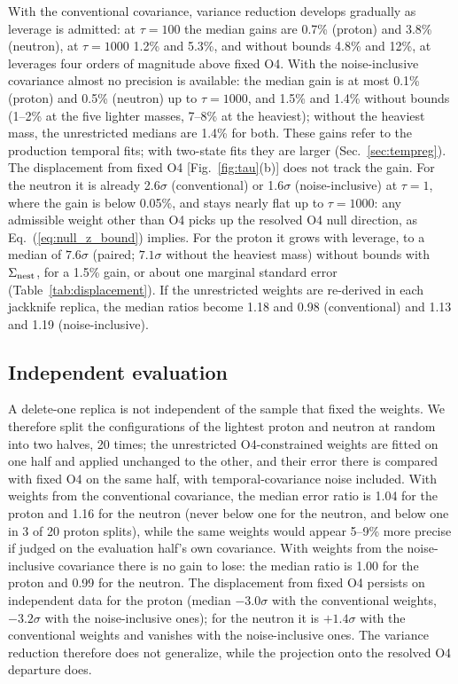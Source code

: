 \documentclass[aps,prd,reprint,twocolumn,superscriptaddress,nofootinbib,longbibliography]{revtex4-2}
\begin{document}
With the conventional covariance, variance reduction develops gradually as leverage is admitted: at $\tau=100$ the median gains are 0.7\% (proton) and 3.8\% (neutron), at $\tau=1000$ 1.2\% and 5.3\%, and without bounds 4.8\% and 12\%, at leverages four orders of magnitude above fixed O4. With the noise-inclusive covariance almost no precision is available: the median gain is at most 0.1\% (proton) and 0.5\% (neutron) up to $\tau=1000$, and 1.5\% and 1.4\% without bounds (1--2\% at the five lighter masses, 7--8\% at the heaviest); without the heaviest mass, the unrestricted medians are 1.4\% for both. These gains refer to the production temporal fits; with two-state fits they are larger (Sec.~\ref{sec:tempreg}). The displacement from fixed O4 [Fig.~\ref{fig:tau}(b)] does not track the gain. For the neutron it is already 2.6$\sigma$ (conventional) or 1.6$\sigma$ (noise-inclusive) at $\tau=1$, where the gain is below 0.05\%, and stays nearly flat up to $\tau=1000$: any admissible weight other than O4 picks up the resolved O4 null direction, as Eq.~(\ref{eq:null_z_bound}) implies. For the proton it grows with leverage, to a median of $7.6\sigma$ (paired; $7.1\sigma$ without the heaviest mass) without bounds with $\Sigma_{\rm nest}$, for a 1.5\% gain, or about one marginal standard error (Table~\ref{tab:displacement}). If the unrestricted weights are re-derived in each jackknife replica, the median ratios become 1.18 and 0.98 (conventional) and 1.13 and 1.19 (noise-inclusive).

\subsection{Independent evaluation}

A delete-one replica is not independent of the sample that fixed the weights. We therefore split the configurations of the lightest proton and neutron at random into two halves, 20 times; the unrestricted O4-constrained weights are fitted on one half and applied unchanged to the other, and their error there is compared with fixed O4 on the same half, with temporal-covariance noise included. With weights from the conventional covariance, the median error ratio is 1.04 for the proton and 1.16 for the neutron (never below one for the neutron, and below one in 3 of 20 proton splits), while the same weights would appear 5--9\% more precise if judged on the evaluation half's own covariance. With weights from the noise-inclusive covariance there is no gain to lose: the median ratio is 1.00 for the proton and 0.99 for the neutron. The displacement from fixed O4 persists on independent data for the proton (median $-3.0\sigma$ with the conventional weights, $-3.2\sigma$ with the noise-inclusive ones); for the neutron it is $+1.4\sigma$ with the conventional weights and vanishes with the noise-inclusive ones. The variance reduction therefore does not generalize, while the projection onto the resolved O4 departure does.
\end{document}
